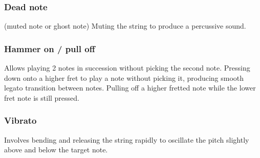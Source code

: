 \documentclass[twoside,11pt]{article}
\begin{document}
\subsubsection{Dead note}
(muted note or ghost note)
Muting the string to produce a percussive sound.
\subsubsection{Hammer on / pull off}
Allows playing 2 notes in succession without picking the second note. Pressing down onto a higher fret to play a note without picking it, producing smooth legato transition between notes. 
Pulling off a higher fretted note while the lower fret note is still pressed.
\subsubsection{Vibrato}
Involves bending and releasing the string rapidly to oscillate the pitch slightly above and below the target note.
\end{document}
